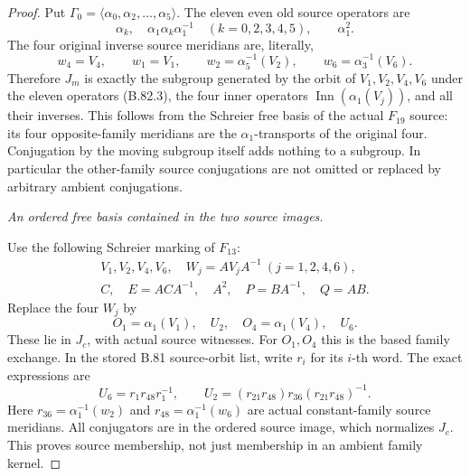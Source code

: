 \begin{proof}
Put \(\Gamma _0=\langle\alpha _0,\alpha _2,\ldots,\alpha _5\rangle\).
The eleven even old source operators are
\[
 \alpha_k,\quad \alpha_1\alpha_k\alpha_1^{-1}
 \quad(k=0,2,3,4,5),\qquad \alpha_1^2.
 \tag{B.82.3}
\]
The four original inverse source meridians are, literally,
\[
 w_4=V_4,\qquad w_1=V_1,\qquad
 w_2=\alpha_5^{-1}(V_2),\qquad
 w_6=\alpha_3^{-1}(V_6).
 \tag{B.82.4}
\]
Therefore \(J_m\) is exactly the subgroup generated by the orbit of
\(V_1,V_2,V_4,V_6\) under the eleven operators (B.82.3), the four
inner operators \(\operatorname{Inn}(\alpha_1(V_j))\), and all their
inverses. This follows from the Schreier free basis of the actual
\(F_{19}\) source: its four opposite-family meridians are the
\(\alpha _1\)-transports of the original four. Conjugation by the
moving subgroup itself adds nothing to a subgroup. In particular the
other-family source conjugations are not omitted or replaced by
arbitrary ambient conjugations.

\emph{An ordered free basis contained in the two source images.}\par
Use the following Schreier marking of \(F_{13}\):
\[
 \begin{gathered}
 V_1,V_2,V_4,V_6,\quad W_j=AV_jA^{-1}\ (j=1,2,4,6),\\
 C,\quad E=ACA^{-1},\quad A^2,\quad P=BA^{-1},\quad Q=AB.
 \end{gathered}
 \tag{B.82.5}
\]
Replace the four \(W_j\) by
\[
 O_1=\alpha_1(V_1),\quad U_2,\quad
 O_4=\alpha_1(V_4),\quad U_6.
 \tag{B.82.6}
\]
These lie in \(J_c\), with actual source witnesses. For \(O_1,O_4\)
this is the based family exchange. In the stored B.81 source-orbit list,
write \(r_i\) for its \(i\)-th word. The exact expressions are
\[
 U_6=r_1r_{48}r_1^{-1},\qquad
 U_2=(r_{21}r_{48})r_{36}(r_{21}r_{48})^{-1}.
 \tag{B.82.7}
\]
Here \(r_{36}=\alpha_1^{-1}(w_2)\) and
\(r_{48}=\alpha_1^{-1}(w_6)\) are actual constant-family source
meridians. All conjugators are in the ordered source image, which
normalizes \(J_c\). This proves source membership, not just membership
in an ambient family kernel.


\end{proof}
